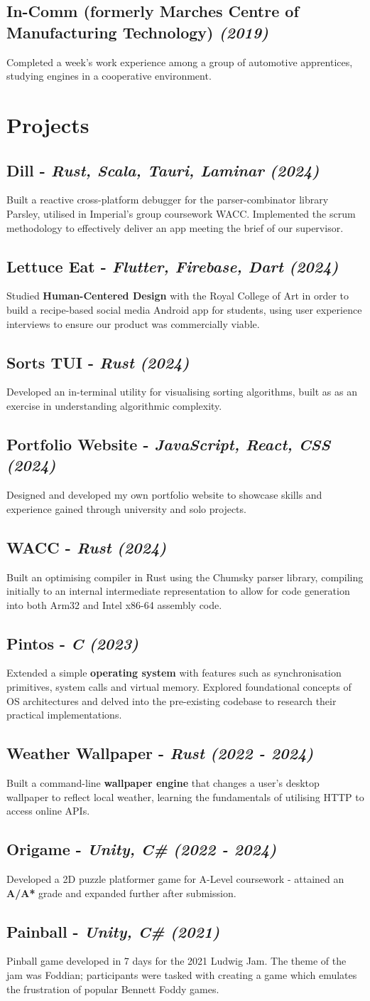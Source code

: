 \documentclass{article}
\newcommand{\dates}[1]{\hfill\textit{(#1)}}
\newcommand{\indentsubsection}[2]{
    \subsection*{#1}
    #2
}
\newcommand{\project}[4]{\indentsubsection{\textbf{#1} - \textit{#3} \dates{#2}}{#4}}
\begin{document}
\indentsubsection{\textbf{In-Comm} (formerly Marches Centre of Manufacturing Technology) \dates{2019}}{
    Completed a week's work experience among a group of automotive apprentices, studying engines in a cooperative environment.
}


\section*{Projects}

\project{Dill }{2024}{Rust, Scala, Tauri, Laminar}{
    Built a reactive cross-platform debugger for the parser-combinator library Parsley, utilised in Imperial's group coursework WACC. 
    Implemented the scrum methodology to effectively deliver an app meeting the brief of our supervisor.
}

\project{Lettuce Eat }{2024}{Flutter, Firebase, Dart}{
    Studied \textbf{Human-Centered Design} with the Royal College of Art in order to build a recipe-based social media Android app for students,
    using user experience interviews to ensure our product was commercially viable.
}

\project{Sorts TUI}{2024}{Rust}{
    Developed an in-terminal utility for visualising sorting algorithms, built as as an exercise in understanding algorithmic complexity.
}

\project{Portfolio Website}{2024}{JavaScript, React, CSS}{
    Designed and developed my own portfolio website to showcase skills and experience gained through university and solo projects.
}

\project{WACC }{2024}{Rust}{
    Built an optimising compiler in Rust using the Chumsky parser library, compiling initially to an 
    internal intermediate representation to allow for code generation into both Arm32 and Intel x86-64 assembly code.
}

\project{Pintos }{2023}{C}{
    Extended a simple \textbf{operating system} with features such as synchronisation primitives, 
    system calls and virtual memory. Explored foundational concepts of OS architectures and delved into the
    pre-existing codebase to research their practical implementations. 
}

\project{Weather Wallpaper}{2022 - 2024}{Rust}{
    Built a command-line \textbf{wallpaper engine} that changes a user's desktop wallpaper to reflect local weather, learning the fundamentals 
    of utilising HTTP to access online APIs.
}

\project{Origame}{2022 - 2024}{Unity, C\#}{
    Developed a 2D puzzle platformer game for A-Level coursework - attained an \textbf{A/A*} grade and expanded further after submission. 
}

\project{Painball}{2021}{Unity, C\#}{
    Pinball game developed in 7 days for the 2021 Ludwig Jam. The theme of the jam was Foddian; 
    participants were tasked with creating a game which emulates the frustration of popular Bennett Foddy games.
}
    
\end{document}
